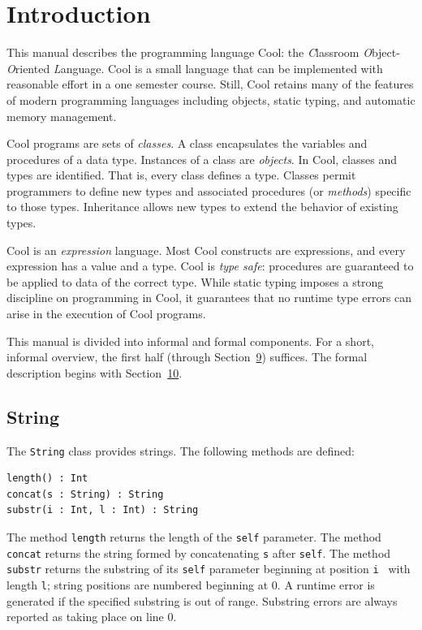 \documentclass[]{article}
\begin{document}
\section{Introduction}

This manual describes the programming language Cool: the
\emph{C}lassroom \emph{O}bject-\emph{O}riented \emph{L}anguage. Cool is
a small language that can be implemented with reasonable effort in a one
semester course. Still, Cool retains many of the features of modern
programming languages including objects, static typing, and automatic
memory management.

Cool programs are sets of \emph{classes}. A class encapsulates the
variables and procedures of a data type. Instances of a class are
\emph{objects}. In Cool, classes and types are identified. That is,
every class defines a type. Classes permit programmers to define new
types and associated procedures (or \emph{methods}) specific to those
types. Inheritance allows new types to extend the behavior of existing
types.

Cool is an \emph{expression} language. Most Cool constructs are
expressions, and every expression has a value and a type. Cool is
\emph{type safe}: procedures are guaranteed to be applied to data of the
correct type. While static typing imposes a strong discipline on
programming in Cool, it guarantees that no runtime type errors can arise
in the execution of Cool programs.

This manual is divided into informal and formal components. For a short,
informal overview, the first half (through
Section~\href{node32.html\#sec-main}{9}) suffices. The formal
description begins with Section~\href{node33.html\#lex-struct}{10}.

\subsection{String}

The \texttt{String} class provides strings. The following methods are
defined:

\begin{verbatim}
length() : Int
concat(s : String) : String
substr(i : Int, l : Int) : String
\end{verbatim}

The method \texttt{length} returns the length of the \texttt{self}
parameter. The method \texttt{concat} returns the string formed by
concatenating \texttt{s} after \texttt{self}. The method \texttt{substr}
returns the substring of its \texttt{self} parameter beginning at
position \texttt{i } with length \texttt{l}; string positions are
numbered beginning at 0. A runtime error is generated if the specified
substring is out of range. Substring errors are always reported as
taking place on line 0.
\end{document}
